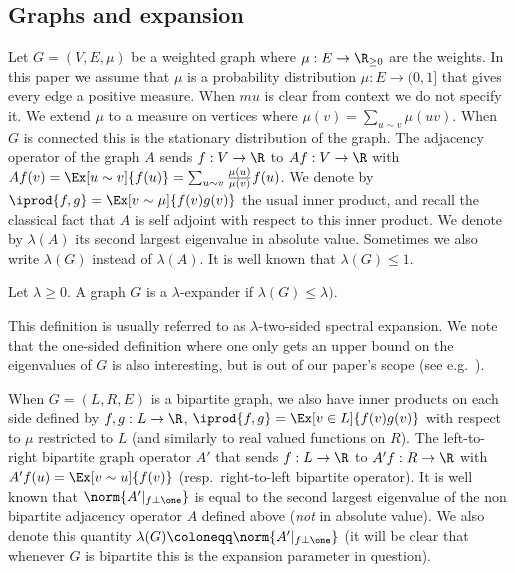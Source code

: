 \subsection{Graphs and expansion} \label{sec:graph-expansion}
Let \(G=(V,E,\mu)\) be a weighted graph where \(\mu:E \to \R_{\geq 0}\) are the weights. In this paper we assume that \(\mu\) is a probability distribution \(\mu:E \to (0,1]\) that gives every edge a positive measure. When \(mu\) is clear from context we do not specify it. We extend \(\mu\) to a measure on vertices where \(\mu(v) = \sum_{u \sim v}\mu(uv)\). When \(G\) is connected this is the stationary distribution of the graph. The adjacency operator of the graph \(A\) sends \(f:V \to \R\) to \(Af: V \to \R\) with \(Af(v) = \Ex[u \sim v]{f(u)} = \sum_{u \sim v} \frac{\mu(u)}{\mu(v)} f(u)\). We denote by \(\iprod{f,g} = \Ex[v \sim \mu]{f(v)g(v)}\) the usual inner product, and recall the classical fact that \(A\) is self adjoint with respect to this inner product. We denote by \(\lambda(A)\) its second largest eigenvalue in absolute value. Sometimes we also write \(\lambda(G)\) instead of \(\lambda(A)\). It is well known that \(\lambda(G) \leq 1\).

\begin{definition}
    Let \(\lambda \geq 0\). A graph \(G\) is a \(\lambda\)-expander if \(\lambda(G)\leq \lambda)\).
\end{definition}

This definition is usually referred to as \(\lambda\)-two-sided spectral expansion. We note that the one-sided definition where one only gets an upper bound on the eigenvalues of \(G\) is also interesting, but is out of our paper's scope (see e.g.\ \cite{hoory2006expander}).

When \(G=(L,R,E)\) is a bipartite graph, we also have inner products on each side defined by \(f,g:L \to \R\), \(\iprod{f,g}=\Ex[v \in L]{f(v)g(v)}\) with respect to \(\mu\) restricted to \(L\) (and similarly to real valued functions on \(R\)). The left-to-right bipartite graph operator \(A'\) that sends \(f:L \to \R\) to \(A'f:R \to \R\) with \(A'f(u) = \Ex[v \sim u]{f(v)}\) (resp.\ right-to-left bipartite operator). It is well known that \(\norm{A'|_{f \bot \one}}\) is equal to the second largest eigenvalue of the non bipartite adjacency operator \(A\) defined above (\emph{not} in absolute value). We also denote this quantity \(\lambda(G) \coloneqq \norm{A'|_{f \bot \one}}\) (it will be clear that whenever \(G\) is bipartite this is the expansion parameter in question).

